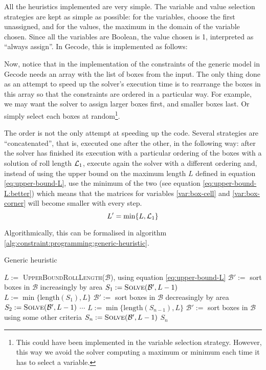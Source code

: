 \hfill

All the heuristics implemented are very simple. The variable and value selection
strategies are kept as simple as possible: for the variables, choose the first
unassigned, and for the values, the maximum in the domain of the variable chosen.
Since all the variables are Boolean, the value chosen is 1, interpreted as ``always
assign''. In Gecode, this is implemented as follows:


Now, notice that in the implementation of the constraints of the generic model
in Gecode needs an array with the list of boxes from the input. The only thing
done as an attempt to speed up the solver's execution time is to rearrange
the boxes in this array so that the constraints are ordered in a particular way.
For example, we may want the solver to assign larger boxes first, and smaller boxes
last. Or simply select each boxes at random\footnote{This could have been implemented
in the variable selection strategy. However, this way we avoid the solver computing
a maximum or minimum each time it has to select a variable.}.

\hfill

The order is not the only attempt at speeding up the code. Several strategies
are ``concatenated'', that is, executed one after the other, in the following
way: after the solver has finished its execution with a particular ordering of
the boxes with a solution of roll length $\mathcal{L}_1$, execute again the solver with a
different ordering and, instead of using the upper bound on the maximum length
$L$ defined in equation \ref{eq:upper-bound-L}, use the minimum of the two (see
equation \ref{eq:upper-bound-L:better}) which means that the matrices for variables
\ref{var:box-cell} and \ref{var:box-corner} will become smaller with every step.
\begin{equation}
\label{eq:upper-bound-L:better}
L' = \min\{L, \mathcal{L}_1\}
\end{equation}

Algorithmically, this can be formalised in algorithm \ref{alg:constraint:programming:generic-heuristic}.

\begin{algorithm}[H]
	\label{alg:constraint:programming:generic-heuristic}
    \DontPrintSemicolon
    
    \caption{Generic heuristic}
    
	$L := $ \textsc{UpperBoundRollLength}($\mathcal{B}$), using equation \ref{eq:upper-bound-L} \;
	$\mathcal{B}' :=$ sort boxes in $\mathcal{B}$ increasingly by area \;
	$S_1 := \textsc{Solve}(\mathcal{B}', L - 1)$ \;
	\;
	$L := \min\{ \text{length}(S_1), L \}$ \;
	$\mathcal{B}' :=$ sort boxes in $\mathcal{B}$ decreasingly by area \;
	$S_2 := \textsc{Solve}(\mathcal{B}', L - 1)$ \;
	\;
	$\cdots$ \;
	\;
	$L := \min\{ \text{length}(S_{n-1}), L \}$ \;
	$\mathcal{B}' :=$ sort boxes in $\mathcal{B}$ using some other criteria \;
	$S_n := \textsc{Solve}(\mathcal{B}', L - 1)$ \;
	\Return $S_n$
\end{algorithm}

